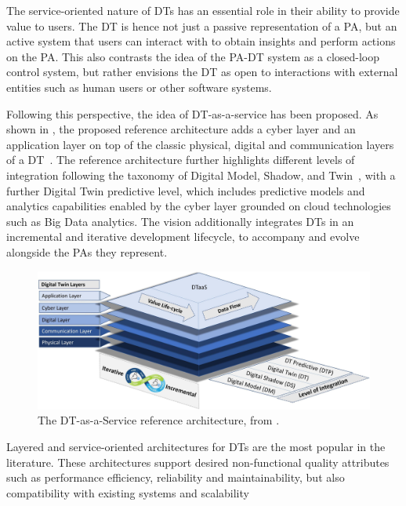 The service-oriented nature of \acp{DT} has an essential role in their ability to provide value to users.
%
The \ac{DT} is hence not just a passive representation of a \ac{PA}, but an active system that users can interact with to obtain insights and perform actions on the \ac{PA}.
%
This also contrasts the idea of the \ac{PA}-\ac{DT} system as a closed-loop control system, but rather envisions the \ac{DT} as open to interactions with external entities such as human users or other software systems.

Following this perspective, the idea of \ac{DT}-as-a-service has been proposed.
As shown in , the proposed reference architecture adds a cyber layer and an application layer on top of the classic physical, digital and communication layers of a \ac{DT}~\cite{aheleroff2021aei}.
%
The reference architecture further highlights different levels of integration following the taxonomy of Digital Model, Shadow, and Twin~\cite{kritzinger2018dtmanufacturing}, with a further Digital Twin predictive level, which includes predictive models and analytics capabilities enabled by the cyber layer grounded on cloud technologies such as Big Data analytics. 
%
The vision additionally integrates \acp{DT} in an incremental and iterative development lifecycle, to accompany and evolve alongside the \acp{PA} they represent. 

\begin{figure}[ht]
    \centering
    \includegraphics[width=\textwidth]{figures/dt-as-a-service.jpg}
    \caption{The DT-as-a-Service reference architecture, from \cite{aheleroff2021aei}.}
    \label{fig:dt-as-a-service}
\end{figure}

Layered and service-oriented architectures for \acp{DT} are the most popular in the literature.
%
These architectures support desired non-functional quality attributes such as performance efficiency, reliability and maintainability, but also compatibility with existing systems and scalability~\cite{ferko2022architecting}

